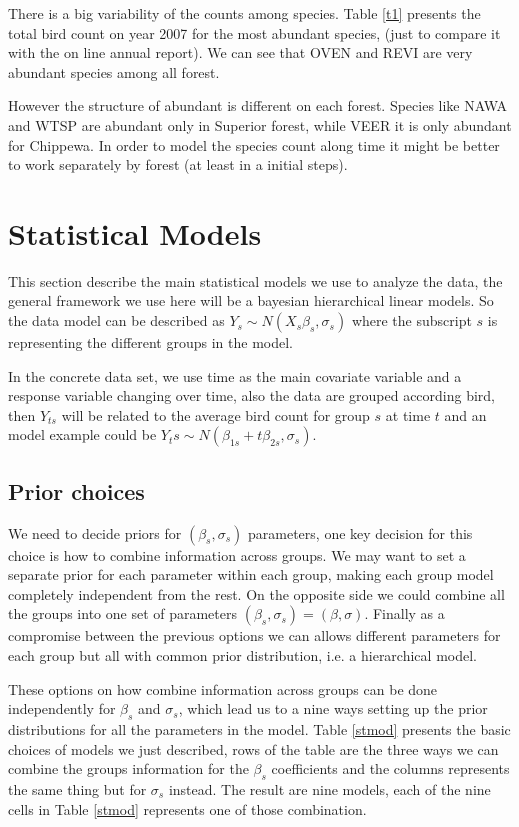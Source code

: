 \documentclass{article}
\begin{document}
There is a big variability of the counts among species. Table \ref{t1} presents the total bird count on year 2007 for the most abundant species, (just to compare it with the on line annual report). We can see that OVEN and REVI are very abundant species among all forest. 

However the structure of abundant is different on each forest. Species like NAWA and WTSP are abundant only in Superior forest, while VEER it is only abundant for Chippewa. In order to model the species count along time it might be better to work separately by forest (at least in a initial steps).  



\newpage

\section{Statistical Models} 
This section describe the main statistical models we use to analyze the data, the general framework we use here will be a bayesian hierarchical linear models. So the data model can be described as $Y_s \sim N(X_s\beta_s, \sigma_s)$ where the subscript $s$ is representing the different groups in the model. 

In the concrete data set, we use time as the main covariate variable and a response variable changing over time, also the data are grouped according bird, then $Y_{ts}$ will be related to the average bird count for group $s$ at time $t$ and an model example could be $Y_ts \sim N(\beta_{1s} + t\beta_{2s}, \sigma_s)$. 

\subsection{Prior choices}
We need to decide priors for $(\beta_s, \sigma_s)$ parameters, one key decision for this choice is how to combine information across groups. We may want to set a separate prior for each parameter within each group, making each group model completely independent from the rest. On the opposite side we could combine all the groups into one set of parameters $(\beta_s, \sigma_s) = (\beta, \sigma)$. Finally as a compromise between the previous options we can allows different parameters for each group but all with common prior distribution, i.e. a hierarchical model. 

These options on how combine information across groups can be done independently for $\beta_s$ and $\sigma_s$, which lead us to a nine ways setting up the prior distributions for all the parameters in the model. Table \ref{stmod} presents the basic choices of models we just described, rows of the table are the three ways we can combine the groups information for the $\beta_s$ coefficients and the columns represents the same thing but for $\sigma_s$ instead. The result are nine models, each of the nine cells in Table \ref{stmod} represents one of those combination. 
 
\end{document}
